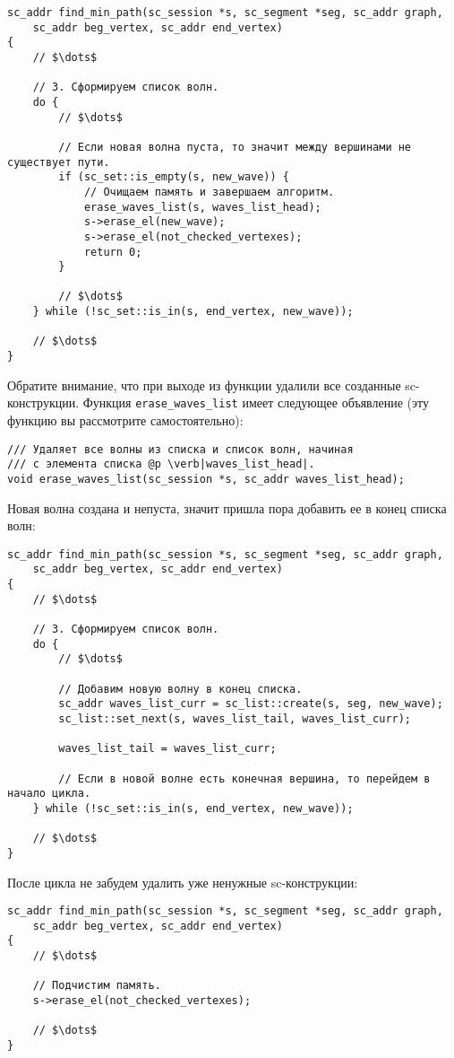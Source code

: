 \begin{lstlisting}[texcl]
sc_addr find_min_path(sc_session *s, sc_segment *seg, sc_addr graph,
    sc_addr beg_vertex, sc_addr end_vertex)
{
    // $\dots$

    // 3. Сформируем список волн.
    do {
        // $\dots$

        // Если новая волна пуста, то значит между вершинами не существует пути.
        if (sc_set::is_empty(s, new_wave)) {
            // Очищаем память и завершаем алгоритм.
            erase_waves_list(s, waves_list_head);
            s->erase_el(new_wave);
            s->erase_el(not_checked_vertexes);
            return 0;
        }

        // $\dots$
    } while (!sc_set::is_in(s, end_vertex, new_wave));

    // $\dots$
}
\end{lstlisting}

Обратите внимание, что при выходе из функции удалили все созданные
sc-конструкции. Функция \lstinline|erase_waves_list| имеет следующее
объявление (эту функцию вы рассмотрите самостоятельно):
\begin{lstlisting}[texcl]
/// Удаляет все волны из списка и список волн, начиная
/// с элемента списка @p \verb|waves_list_head|.
void erase_waves_list(sc_session *s, sc_addr waves_list_head);
\end{lstlisting}

Новая волна создана и непуста, значит пришла пора добавить ее в конец
списка волн:
\begin{lstlisting}[texcl]
sc_addr find_min_path(sc_session *s, sc_segment *seg, sc_addr graph,
    sc_addr beg_vertex, sc_addr end_vertex)
{
    // $\dots$

    // 3. Сформируем список волн.
    do {
        // $\dots$

        // Добавим новую волну в конец списка.
        sc_addr waves_list_curr = sc_list::create(s, seg, new_wave);
        sc_list::set_next(s, waves_list_tail, waves_list_curr);

        waves_list_tail = waves_list_curr;

        // Если в новой волне есть конечная вершина, то перейдем в начало цикла.
    } while (!sc_set::is_in(s, end_vertex, new_wave));

    // $\dots$
}
\end{lstlisting}

После цикла не забудем удалить уже ненужные sc-конструкции:
\begin{lstlisting}[texcl]
sc_addr find_min_path(sc_session *s, sc_segment *seg, sc_addr graph,
    sc_addr beg_vertex, sc_addr end_vertex)
{
    // $\dots$

    // Подчистим память.
    s->erase_el(not_checked_vertexes);

    // $\dots$
}
\end{lstlisting}


